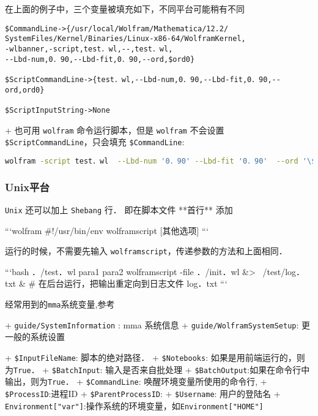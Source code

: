 在上面的例子中，三个变量被填充如下，不同平台可能稍有不同

\begin{lstlisting}
$CommandLine->{/usr/local/Wolfram/Mathematica/12.2/
SystemFiles/Kernel/Binaries/Linux-x86-64/WolframKernel,
-wlbanner,-script,test．wl,--,test．wl,
--Lbd-num,0．90,--Lbd-fit,0．90,--ord,$ord0}

$ScriptCommandLine->{test．wl,--Lbd-num,0．90,--Lbd-fit,0．90,--ord,ord0}

$ScriptInputString->None
\end{lstlisting}

+ 也可用 \verb`wolfram` 命令运行脚本，但是 \verb`wolfram` 不会设置 \verb`$ScriptCommandLine`，只会填充 \verb`$CommandLine`:

\begin{lstlisting}[language=bash]
wolfram -script test．wl  --Lbd-num '0．90' --Lbd-fit '0．90'  --ord '\$ord0'
\end{lstlisting}

\subsubsection{Unix平台} 

\verb`Unix` 还可以加上 \verb`Shebang` 行． 即在脚本文件 **首行** 添加

```wolfram
#!/usr/bin/env wolframscript [其他选项]
```

运行的时候，不需要先输入 \verb`wolframscript`，传递参数的方法和上面相同．

```bash
．/test．wl para1 para2
wolframscript -file ．/init．wl &> ~/test/log．txt & # 在后台运行，把输出重定向到日志文件 log．txt
```

经常用到的\verb`mma`系统变量,参考

+ \verb`guide/SystemInformation` : mma 系统信息
+ \verb`guide/WolframSystemSetup`: 更一般的系统设置

+ \verb`$InputFileName`: 脚本的绝对路径．
+ \verb`$Notebooks`: 如果是用前端运行的，则为\verb`True`．
+ \verb`$BatchInput`: 输入是否来自批处理
+ \verb`$BatchOutput`:如果在命令行中输出，则为\verb`True`．
+ \verb`$CommandLine`: 唤醒环境变量所使用的命令行,
+ \verb`$ProcessID`:进程ID
+ \verb`$ParentProcessID`:
+ \verb`$Username`: 用户的登陆名
+ \verb`Environment["var"]`:操作系统的环境变量，如\verb`Environment["HOME"]`